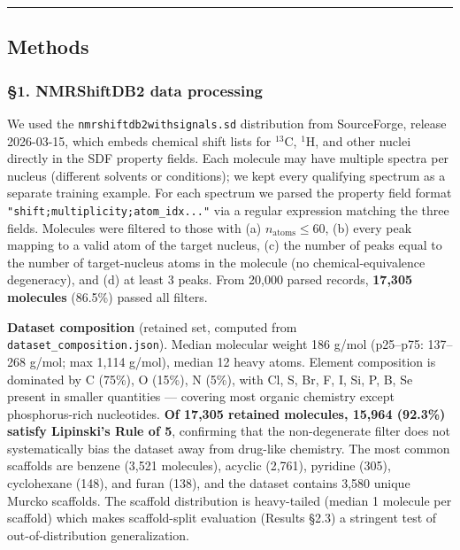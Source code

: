 \documentclass[
]{article}
\begin{document}
\begin{center}\rule{0.5\linewidth}{0.5pt}\end{center}

\subsection{Methods}\label{methods}

\subsubsection{§1. NMRShiftDB2 data
processing}\label{nmrshiftdb2-data-processing}

We used the \texttt{nmrshiftdb2withsignals.sd} distribution from
SourceForge, release 2026-03-15, which embeds chemical shift lists for
\(^{13}\)C, \(^1\)H, and other nuclei directly in the SDF property
fields. Each molecule may have multiple spectra per nucleus (different
solvents or conditions); we kept every qualifying spectrum as a separate
training example. For each spectrum we parsed the property field format
\texttt{"shift;multiplicity;atom\_idx\textbar{}..."} via a regular
expression matching the three fields. Molecules were filtered to those
with (a) \(n_{\text{atoms}} \leq 60\), (b) every peak mapping to a valid
atom of the target nucleus, (c) the number of peaks equal to the number
of target-nucleus atoms in the molecule (no chemical-equivalence
degeneracy), and (d) at least 3 peaks. From 20,000 parsed records,
\textbf{17,305 molecules} (86.5\%) passed all filters.

\textbf{Dataset composition} (retained set, computed from
\texttt{dataset\_composition.json}). Median molecular weight 186 g/mol
(p25--p75: 137--268 g/mol; max 1,114 g/mol), median 12 heavy atoms.
Element composition is dominated by C (75\%), O (15\%), N (5\%), with
Cl, S, Br, F, I, Si, P, B, Se present in smaller quantities --- covering
most organic chemistry except phosphorus-rich nucleotides. \textbf{Of
17,305 retained molecules, 15,964 (92.3\%) satisfy Lipinski's Rule of
5}, confirming that the non-degenerate filter does not systematically
bias the dataset away from drug-like chemistry. The most common
scaffolds are benzene (3,521 molecules), acyclic (2,761), pyridine
(305), cyclohexane (148), and furan (138), and the dataset contains
3,580 unique Murcko scaffolds. The scaffold distribution is heavy-tailed
(median 1 molecule per scaffold) which makes scaffold-split evaluation
(Results §2.3) a stringent test of out-of-distribution generalization.
\end{document}
